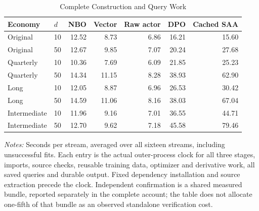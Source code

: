 \begin{table}[!htbp]
\centering\footnotesize
\caption{Complete Construction and Query Work}\label{tab:r16menuwork}
\begin{tabular}{llrrrrr}
\toprule
Economy & $d$ & NBO & Vector & Raw actor & DPO & Cached SAA \\
\midrule
Original & 10 & 12.52 & 8.73 & 6.86 & 16.21 & 15.60 \\
Original & 50 & 12.67 & 9.85 & 7.07 & 20.24 & 27.68 \\
Quarterly & 10 & 10.36 & 7.69 & 6.09 & 21.85 & 25.23 \\
Quarterly & 50 & 14.34 & 11.15 & 8.28 & 38.93 & 62.90 \\
Long & 10 & 12.05 & 8.87 & 6.96 & 26.53 & 30.42 \\
Long & 50 & 14.59 & 11.06 & 8.16 & 38.03 & 67.04 \\
Intermediate & 10 & 11.96 & 9.16 & 7.01 & 36.55 & 44.71 \\
Intermediate & 50 & 12.70 & 9.62 & 7.18 & 45.58 & 79.46 \\
\bottomrule
\end{tabular}
\begin{minipage}{0.97\linewidth}\footnotesize\emph{Notes:} Seconds per stream, averaged over all sixteen streams, including unsuccessful fits. Each entry is the actual outer-process clock for all three stages, imports, source checks, reusable training data, optimizer and derivative work, all saved queries and durable output. Fixed dependency installation and source extraction precede the clock. Independent confirmation is a shared measured bundle, reported separately in the complete account; the table does not allocate one-fifth of that bundle as an observed standalone verification cost.
\end{minipage}
\end{table}
